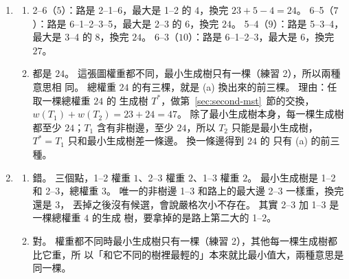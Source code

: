 \begin{enumerate}
\item
\begin{enumerate}
\item 2--6（$5$）：路是 2--1--6，最大是 1--2 的 $4$，換完 $23 + 5 - 4 = 24$。
6--5（$7$）：路是 6--1--2--3--5，最大是 2--3 的 $6$，換完 $24$。 5--4（$9$）：路是
5--3--4，最大是 3--4 的 $8$，換完 $24$。 6--3（$10$）：路是 6--1--2--3，最大是
$6$，換完 $27$。
\item 都是 $24$。 這張圖權重都不同，最小生成樹只有一棵（練習 2），所以兩種意思相
同。 總權重 $24$ 的有三棵，就是 (a) 換出來的前三棵。 理由：任取一棵總權重 $24$ 的
生成樹 $T^*$，做第~\ref{sec:second-mst}~節的交換，$w(T_1) + w(T_2) = 23 + 24 = 47$。
除了最小生成樹本身，每一棵生成樹都至少 $24$；$T_1$ 含有非樹邊，至少 $24$，所以
$T_2$ 只能是最小生成樹，$T^* = T_1$ 只和最小生成樹差一條邊。 換一條邊得到 $24$ 的
只有 (a) 的前三種。
\end{enumerate}

\item
\begin{enumerate}
\item 錯。 三個點，1--2 權重 $1$、2--3 權重 $2$、1--3 權重 $2$。 最小生成樹是 1--2
和 2--3，總權重 $3$。 唯一的非樹邊 1--3 和路上的最大邊 2--3 一樣重，換完還是 $3$，
丟掉之後沒有候選，會說嚴格次小不存在。 其實 2--3 加 1--3 是一棵總權重 $4$ 的生成
樹，要拿掉的是路上第二大的 1--2。
\item 對。 權重都不同時最小生成樹只有一棵（練習 2），其他每一棵生成樹都比它重，所
以「和它不同的樹裡最輕的」本來就比最小值大，兩種意思是同一棵。
\end{enumerate}
\end{enumerate}
